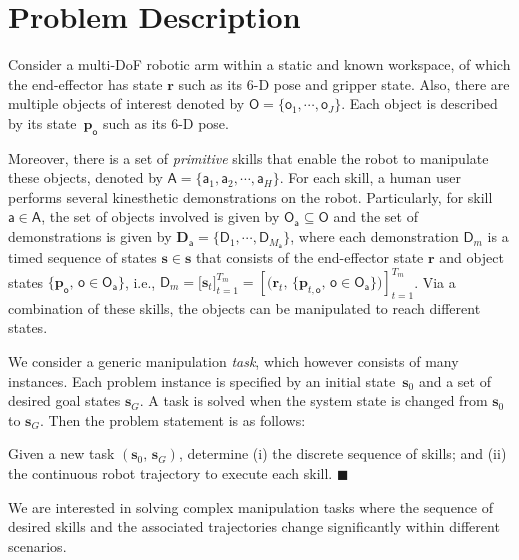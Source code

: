 \section{Problem Description}\label{sec:problem}

Consider a multi-DoF robotic arm within a static and known workspace, of which the end-effector has state $\boldsymbol{r}$ such as its 6-D pose and gripper state.
Also, there are multiple objects of interest denoted by $\mathsf{O}=\{\mathsf{o}_1,\cdots,\mathsf{o}_J\}$. 
Each object is described by its state~$\boldsymbol{p}_{\mathsf{o}}$ such as its 6-D pose.

Moreover, there is a set of \emph{primitive} skills that enable the robot to manipulate these objects, denoted by $\mathsf{A}=\{\mathsf{a}_1,\mathsf{a}_2,\cdots,\mathsf{a}_H\}$.  
For each skill, a human user performs several kinesthetic  demonstrations on the robot.
Particularly, for skill $\mathsf{a}\in \mathsf{A}$, the set of objects involved is given by $\mathsf{O}_{\mathsf{a}} \subseteq \mathsf{O}$ and the set of demonstrations is given by $\boldsymbol{D}_{\mathsf{a}}=\{\mathsf{D}_1,\cdots, \mathsf{D}_{M_{\mathsf{a}}}\}$, where each demonstration $\mathsf{D}_m$ is a {timed} sequence of states $\mathbf{s}\in \mathbf{s}$ that consists of the end-effector state $\boldsymbol{r}$ and object states $\{\boldsymbol{p}_{\mathsf{o}}, \, \mathsf{o}\in \mathsf{O}_{\mathsf{a}}\}$, i.e.,
$\mathsf{D}_m = \big[\mathbf{s}_t\big]_{t=1}^{T_m} = \left[\big(\boldsymbol{r}_t, \,\{\boldsymbol{p}_{t,\mathsf{o}}, \, \mathsf{o}\in \mathsf{O}_{\mathsf{a}}\} \big)\right]_{t=1}^{T_m}$.
Via a combination of these skills, the objects can be manipulated to reach different states. 

We consider a generic manipulation \emph{task}, which however consists of many {instances}. 
Each problem instance is specified by an initial state~$\mathbf{s}_0$ and a set of desired goal states $\mathbf{s}_G$. 
A task is solved when the system state is changed from $\mathbf{s}_0$ to $\mathbf{s}_G$.
Then the problem statement is as follows:
\begin{problem}\label{main-problem}
Given a new task $(\mathbf{s}_0,\,\mathbf{s}_G)$, determine (i) the discrete sequence of skills; 
and (ii) the continuous robot trajectory to execute each skill. \hfill $\blacksquare$
\end{problem}

We are interested in solving complex manipulation tasks where the sequence of desired skills and the associated trajectories change significantly within different scenarios. 
